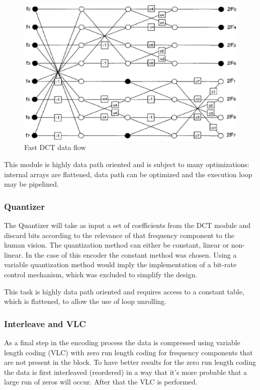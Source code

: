 \documentclass[a4paper, 12pt]{article}
\begin{document}
\begin{figure}[h]
\centering
\includegraphics[width=15cm]{figs/butterfly.eps}
\caption{Fast DCT data flow}
\label{fig:dctbutterfly}
\end{figure}

	This module is highly data path oriented and is subject to many optimizations: internal arrays are flattened, data path can be optimized and the execution loop may be pipelined.

\subsubsection{Quantizer}
	The Quantizer will take as input a set of coefficients from the DCT module and discard bits according to the relevance of that frequency component to the human vision. The quantization method can either be constant, linear or non-linear. In the case of this encoder the constant method was chosen. Using a variable quantization method would imply the implementation of a bit-rate control mechanism, which was excluded to simplify the design.
	
	This task is highly data path oriented and requires access to a constant table, which is flattened, to allow the use of loop unrolling.

\subsubsection{Interleave and VLC}
	As a final step in the encoding process the data is compressed using variable length coding (VLC) with zero run length coding for frequency components that are not present in the block. To have better results for the zero run length coding the data is first interleaved (reordered) in a way that it's more probable that a large run of zeros will occur. After that the VLC is performed. 
	
\end{document}
